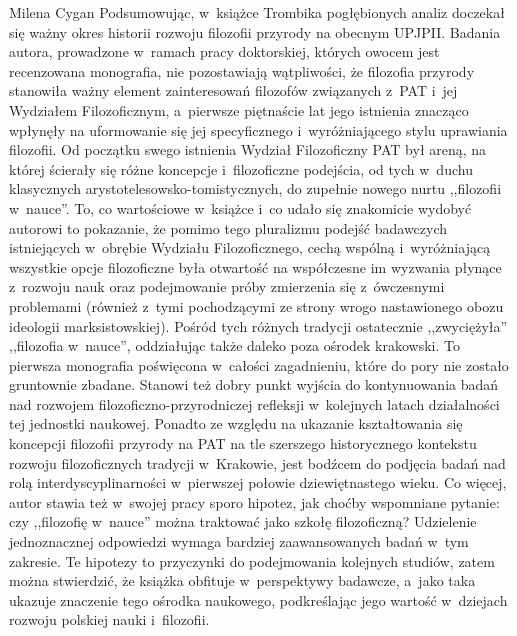 \begin{newrevplenv}{Milena Cygan}
Podsumowując, w~książce Trombika pogłębionych analiz doczekał się ważny okres historii rozwoju filozofii przyrody na obecnym UPJPII. Badania autora, prowadzone w~ramach pracy doktorskiej, których owocem jest recenzowana monografia, nie pozostawiają wątpliwości, że filozofia przyrody stanowiła ważny element zainteresowań filozofów związanych z~PAT i~jej Wydziałem Filozoficznym, a~pierwsze piętnaście lat jego istnienia znacząco wpłynęły na uformowanie się jej specyficznego i~wyróżniającego stylu uprawiania filozofii. Od początku swego istnienia Wydział Filozoficzny PAT był areną, na której ścierały się różne koncepcje i~filozoficzne podejścia, od tych w~duchu klasycznych arystotelesowsko-tomistycznych, do zupełnie nowego nurtu ,,filozofii w~nauce''. To, co wartościowe w~książce i~co udało się znakomicie wydobyć autorowi to pokazanie, że pomimo tego pluralizmu podejść badawczych istniejących w~obrębie Wydziału Filozoficznego, cechą wspólną i~wyróżniającą wszystkie opcje filozoficzne była otwartość na współczesne im wyzwania płynące z~rozwoju nauk oraz podejmowanie próby zmierzenia się z~ówczesnymi problemami (również z~tymi pochodzącymi ze strony wrogo nastawionego obozu ideologii marksistowskiej). Pośród tych różnych tradycji ostatecznie ,,zwyciężyła'' ,,filozofia w~nauce'', oddziałując także daleko poza ośrodek krakowski. To pierwsza monografia poświęcona w~całości zagadnieniu, które do pory nie zostało gruntownie zbadane. Stanowi też dobry punkt wyjścia do kontynuowania badań nad rozwojem filozoficzno-przyrodniczej refleksji w~kolejnych latach działalności tej jednostki naukowej. Ponadto ze względu na ukazanie kształtowania się koncepcji filozofii przyrody na PAT na tle szerszego historycznego kontekstu rozwoju filozoficznych tradycji w~Krakowie, jest bodźcem do podjęcia badań nad rolą interdyscyplinarności w~pierwszej połowie dziewiętnastego wieku. Co więcej, autor stawia też w~swojej pracy sporo hipotez, jak choćby wspomniane pytanie: czy ,,filozofię w~nauce'' można traktować jako szkołę filozoficzną? Udzielenie jednoznacznej odpowiedzi wymaga bardziej zaawansowanych badań w~tym zakresie. Te hipotezy to przyczynki do podejmowania kolejnych studiów, zatem można stwierdzić, że książka obfituje w~perspektywy badawcze, a~jako taka ukazuje znaczenie tego ośrodka naukowego, podkreślając jego wartość w~dziejach rozwoju polskiej nauki i~filozofii.




\vspace{5mm}%
\begin{flushright}
{\chaptitleeng\color{black!50}{Between tradition and modernity}}
\end{flushright}


\end{newrevplenv}
